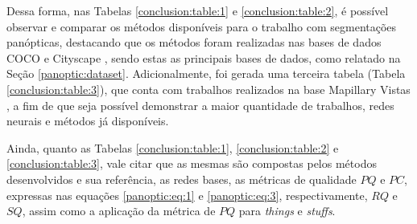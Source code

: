 Dessa forma, nas Tabelas \ref{conclusion:table:1} e \ref{conclusion:table:2}, é possível observar e comparar os métodos disponíveis para o trabalho com segmentações panópticas, destacando que os métodos foram realizadas nas bases de dados COCO \cite{Lin2014} e Cityscape \cite{Cordts2016}, sendo estas as principais bases de dados, como relatado na Seção \ref{panoptic:dataset}. Adicionalmente, foi gerada uma terceira tabela (Tabela \ref{conclusion:table:3}), que conta com trabalhos realizados na base Mapillary Vistas \cite{Neuhold2017_ICCV}, a fim de que seja possível demonstrar a maior quantidade de trabalhos, redes neurais e métodos já disponíveis.

Ainda, quanto as Tabelas \ref{conclusion:table:1}, \ref{conclusion:table:2} e \ref{conclusion:table:3}, vale citar que as mesmas são compostas pelos métodos desenvolvidos e sua referência, as redes bases, as métricas de qualidade $PQ$ e $PC$, expressas nas equações \ref{panoptic:eq:1} e \ref{panoptic:eq:3}, respectivamente, $RQ$ e $SQ$, assim como a aplicação da métrica de $PQ$ para \textit{things} e \textit{stuffs}.


